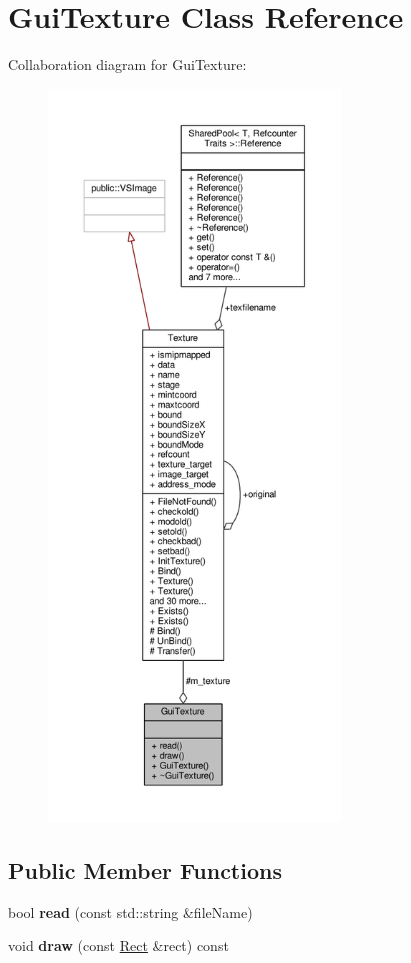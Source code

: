 \hypertarget{classGuiTexture}{}\section{Gui\+Texture Class Reference}
\label{classGuiTexture}


Collaboration diagram for Gui\+Texture\+:
\nopagebreak
\begin{figure}[H]
\begin{center}
\leavevmode
\includegraphics[height=550pt]{d1/df1/classGuiTexture__coll__graph}
\end{center}
\end{figure}
\subsection*{Public Member Functions}
\begin{DoxyCompactItemize}
\item 
bool {\bfseries read} (const std\+::string \&file\+Name)\hypertarget{classGuiTexture_afd3bc6bf39ba21ae58340e20f30b93a4}{}\label{classGuiTexture_afd3bc6bf39ba21ae58340e20f30b93a4}

\item 
void {\bfseries draw} (const \hyperlink{classRect}{Rect} \&rect) const \hypertarget{classGuiTexture_a1b3a6aa926ff7f623b72f095fac1ca65}{}\label{classGuiTexture_a1b3a6aa926ff7f623b72f095fac1ca65}

\end{DoxyCompactItemize}
